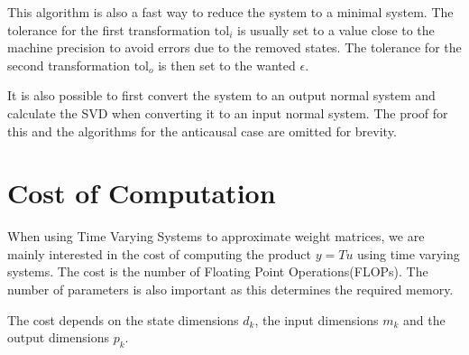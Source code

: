 \documentclass[doctype=mastersthesis,BCOR=15mm,biblatex]{ldvbook}%
\begin{document}
This algorithm is also a fast way to reduce the system to a minimal system.
The tolerance for the first transformation $\text{tol}_i$ is usually set to a value close to the machine precision to avoid errors due to the removed states.
The tolerance for the second transformation $\text{tol}_o$ is then set to the wanted $\epsilon$.
 
It is also possible to first convert the system to an output normal system and calculate the SVD when converting it to an input normal system.
The proof for this and the algorithms for the anticausal case are omitted for brevity.

 
 

\section{Cost of Computation} \label{sec:cost}
When using Time Varying Systems to approximate weight matrices, we are mainly interested in the cost of computing the product $y = Tu$ using time varying systems.
The cost is the number of Floating Point Operations(FLOPs).
The number of parameters is also important as this determines the required memory.

The cost depends on the state dimensions $d_k$, the input dimensions $m_k$ and the output dimensions $p_k$.
\end{document}
